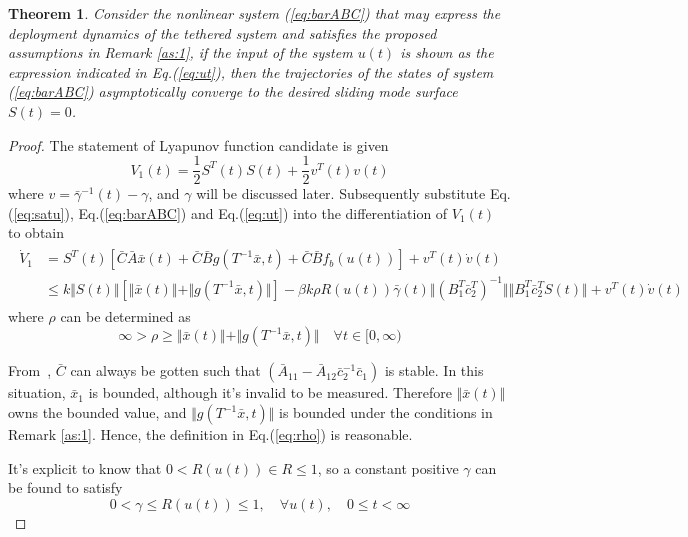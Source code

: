 \documentclass[3p]{elsarticle}
\theoremstyle{plain}
\newtheorem{thm}{Theorem}
\begin{document}
\begin{thm}
Consider the nonlinear system (\ref{eq:barABC}) that  may express the deployment dynamics of the tethered system and satisfies the proposed assumptions in Remark \ref{as:1}, if the input of the system $u(t)$ is shown as the expression indicated in Eq.(\ref{eq:ut}), then the trajectories of the states of system (\ref{eq:barABC}) asymptotically converge to the desired sliding mode surface $S(t)=0$.
\end{thm}
\begin{proof}
The statement of Lyapunov function candidate is given
\begin{equation}
V_1(t) = \frac{1}{2}S^T(t)S(t)+\frac{1}{2}v^T(t)v(t)\label{eq:V1}
\end{equation}
where $v = \bar{\gamma}^{-1}(t)-\gamma$, and $\gamma$ will be discussed later. Subsequently substitute Eq.(\ref{eq:satu}), Eq.(\ref{eq:barABC}) and Eq.(\ref{eq:ut}) into the differentiation of $V_1(t)$ to obtain
\begin{align}
\begin{split}
\dot{V}_1 &= S^T(t)[\bar{C}\bar{A}\bar{x}(t)+\bar{C}\bar{B}g(T^{-1}\bar{x},t)+\bar{C}\bar{B}f_b(u(t))]+v^T(t)\dot{v}(t)\\
&\le k\Vert S(t)\Vert[\Vert \bar{x}(t)\Vert+\Vert g(T^{-1}\bar{x},t)\Vert] - \beta k \rho R(u(t))\bar{\gamma}(t)\Vert(B_1^T\bar{c}^T_2)^{-1}\Vert \Vert B^T_1\bar{c}_2^TS(t)\Vert+v^T(t)\dot{v}(t)\label{eq:dotV1}
\end{split}
\end{align}
where $\rho$ can be determined as
\begin{equation}
\infty > \rho \ge \Vert\bar{x}(t)\Vert + \Vert g(T^{-1}\bar{x},t)\Vert \quad \forall t \in [0,\infty)\label{eq:rho}
\end{equation}\par
From~\cite{lyshevski2012control}, $\bar{C}$ can always be gotten such that $(\bar{A}_{11}-\bar{A}_{12}\bar{c}_2^{-1}\bar{c}_1)$ is stable. In this situation, $\bar{x}_1$ is bounded, although it's invalid to be measured. Therefore $\Vert\bar{x}(t)\Vert$ owns the bounded value, and $\Vert g(T^{-1}\bar{x},t)\Vert$ is bounded under  the conditions in Remark \ref{as:1}. Hence, the definition in Eq.(\ref{eq:rho}) is reasonable.\par
It's explicit to know that $0<R(u(t))\in R\le 1$, so a constant positive $\gamma$ can be found to satisfy
\begin{equation}
0<\gamma\le R(u(t))\le 1,\quad \forall u(t),\quad 0\le t< \infty \label{eq:utl}

\end{equation}
\end{proof}
\end{document}
